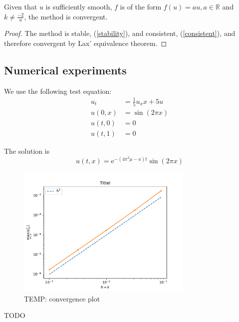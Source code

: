 \begin{theorem}
    Given that $u$ is sufficiently smooth,  $f$ is of the form $f(u)=au, a\in \mathbb{R}$ and $k \neq \frac{-2}{a}$, the method is convergent.
\end{theorem}

\begin{proof}
    The method is stable, (\ref{stability}), and consistent, (\ref{consistent}), and therefore convergent by Lax' equivalence theorem.
\end{proof}
\subsection{Numerical experiments}

We use the following test equation:
\begin{align}
  u_t &= \frac{1}{5}u_xx + 5 u \\
  u(0, x) &= \sin (2\pi x) \\
  u(t, 0) &= 0 \\
  u(t, 1) &= 0
\end{align}

The solution is
\begin{equation}
  \label{eq:anal_sol}
  u(t, x) = \text{e}^{-(4\pi^2 \mu - a)t}\sin(2\pi x)
\end{equation}

\begin{figure}[h]
    \centering
    \includegraphics[width=0.75\textwidth]{Images/plots/temp_task1.pdf}
    \caption{TEMP: convergence plot}
    \label{fig:mesh1}
\end{figure}

TODO
